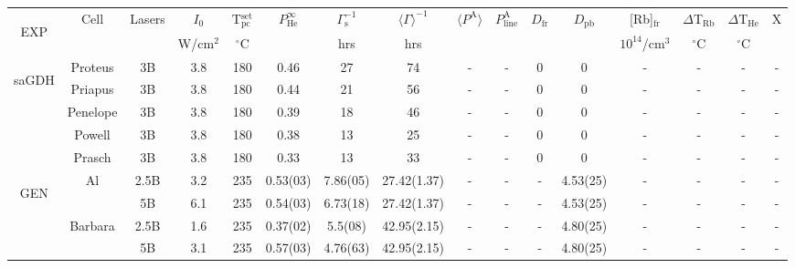 \begin{table}\tiny
	\captionsetup{font=scriptsize}
	\begin{center}
		\def\arraystretch{0.75}
		\setlength\tabcolsep{0.5pt}
		\begin{tabular}{|c|c|ccc|ccc|ccccc|cc|c|}
			\hline
			\multirow{2}{*}{\begin{sideways}{EXP}\end{sideways}}&\multirow{2}{*}{Cell} & \multirow{2}{*}{Lasers} & $I_0$ & T$_\mathrm{pc}^\mathrm{set}$ & \multirow{2}{*}{$P_\mathrm{He}^\infty$} & $\Gamma_\mathrm{s}^{-1}$ & $\langle\Gamma\rangle^{-1}$ & \multirow{2}{*}{$\langle P^\mathrm{A} \rangle$} & \multirow{2}{*}{$P_\mathrm{line}^\mathrm{A}$} & \multirow{2}{*}{$D_\mathrm{fr}$} & \multirow{2}{*}{$D_\mathrm{pb}$} & [Rb]$_\mathrm{fr}$ & $\Delta$T$_\mathrm{Rb}$ & $\Delta$T$_\mathrm{He}$ & \multirow{2}{*}{X}\\
			&& & W/cm$^2$ & $^\circ$C & & hrs & hrs & & & & & $10^{14}$/cm$^3$ & $^\circ$C & $^\circ$C &\\
			\hline
			\hline
			\multirow{5}{*}{\begin{sideways}saGDH\end{sideways}} & Proteus & 3B & 3.8 & 180 & 0.46 & 27 & 74 & - & - & 0 & 0 & - & - & - & -\\
			\cline{2-16}
			& Priapus & 3B & 3.8 & 180 & 0.44 & 21 & 56 & - & - & 0 & 0 & - & - & - & -\\
			\cline{2-16}
			& Penelope & 3B & 3.8 & 180 & 0.39 & 18 & 46 & - & - & 0 & 0 & - & - & - & -\\
			\cline{2-16}
			& Powell & 3B & 3.8 & 180 & 0.38 & 13 & 25 & - & - & 0 & 0 & - & - & - & -\\
			\cline{2-16}
			& Prasch & 3B & 3.8 & 180 & 0.33 & 13 & 33 & - & - & 0 & 0 & - & - & - & -\\
			\hline
			\hline
			\multirow{20}{*}{\begin{sideways}GEN\end{sideways}} & \multirow{2}{*}{Al} & 2.5B & 3.2 & 235 & 0.53(03) & 7.86(05) & 27.42(1.37) & - & - & - & 4.53(25) & - & - & - & - \\
			& & 5B & 6.1 & 235 & 0.54(03) & 6.73(18) & 27.42(1.37) & - & - & - & 4.53(25) & - & - & - & - \\
			\cline{2-16}
			& \multirow{2}{*}{Barbara} & 2.5B & 1.6 & 235 & 0.37(02) & 5.5(08) & 42.95(2.15) & - & - & - & 4.80(25) & - & - & - & - \\
			& & 5B & 3.1 & 235 & 0.57(03) & 4.76(63) & 42.95(2.15) & - & - & - & 4.80(25) & - & - & - & - \\

\end{tabular}
\end{center}
\end{table}
